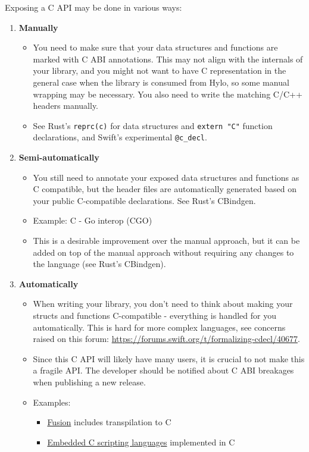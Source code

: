 Exposing a C API may be done in various ways:
\begin{enumerate}[label=(\alph*)]
\item \textbf{Manually}
  \begin{itemize}
  \item You need to make sure that your data structures and functions are marked with C ABI annotations. This may not align with the internals of your library, and you might not want to have C representation in the general case when the library is consumed from Hylo, so some manual wrapping may be necessary. You also need to write the matching C/C++ headers manually.
  \item See Rust's \texttt{reprc(c)} for data structures and \texttt{extern "C"} function declarations, and Swift's experimental \texttt{@c\_decl}.
  \end{itemize}
\item \textbf{Semi-automatically}
  \begin{itemize}
  \item You still need to annotate your exposed data structures and functions as C compatible, but the header files are automatically generated based on your public C-compatible declarations. See Rust's CBindgen.
  \item Example: C - Go interop (CGO)
  \item This is a desirable improvement over the manual approach, but it can be added on top of the manual approach without requiring any changes to the language (see Rust's CBindgen). %
  \end{itemize}
\item \textbf{Automatically}
  \begin{itemize}
  \item When writing your library, you don't need to think about making your structs and functions C-compatible - everything is handled for you automatically. This is hard for more complex languages, see concerns raised on this forum: \url{https://forums.swift.org/t/formalizing-cdecl/40677}. %
  \item Since this C API will likely have many users, it is crucial to not make this a fragile API. The developer should be notified about C ABI breakages when publishing a new release.
  \item Examples:
    \begin{itemize}
    \item \href{https://github.com/fusionlanguage/fut/tree/master}{Fusion} includes transpilation to C
    \item \href{https://dbohdan.github.io/embedded-scripting-languages/}{Embedded C scripting languages} implemented in C
    \end{itemize}
  \end{itemize}
\end{enumerate}


